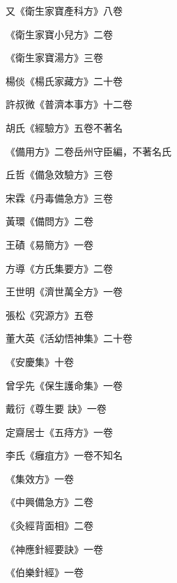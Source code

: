 \begin{pinyinscope}
 又《衛生家寶產科方》八卷



 《衛生家寶小兒方》二卷



 《衛生家寶湯方》三卷



 楊倓《楊氏家藏方》二十卷



 許叔微《普濟本事方》十二卷



 胡氏《經驗方》五卷不著名



 《備用方》二卷岳州守臣編，不著名氏



 丘哲《備急效驗方》三卷



 宋霖《丹毒備急方》三卷



 黃環《備問方》二卷



 王磧《易簡方》一卷



 方導《方氏集要方》二卷



 王世明《濟世萬全方》一卷



 張松《究源方》五卷



 董大英《活幼悟神集》二十卷



 《安慶集》十卷



 曾孚先《保生護命集》一卷



 戴衍《尊生要
 訣》一卷



 定齋居士《五痔方》一卷



 李氏《癰疽方》一卷不知名



 《集效方》一卷



 《中興備急方》二卷



 《灸經背面相》二卷



 《神應針經要訣》一卷



 《伯樂針經》一卷




\end{pinyinscope}
